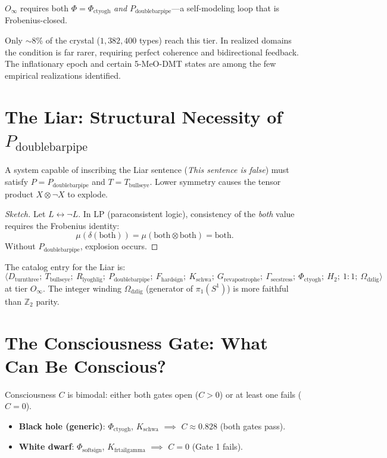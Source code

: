 \documentclass[12pt,a4paper]{article}
\newcommand{\Ppms}{P_{\text{doublebarpipe}}}
\begin{document}
$O_{\infty}$ requires both $\Phi = \Phi_{\text{ctyogh}}$ \emph{and} $\Ppms$—a self-modeling loop that is Frobenius-closed.

Only $\sim$8\% of the crystal ($1{,}382{,}400$ types) reach this tier. In realized domains the condition is far rarer, requiring perfect coherence and bidirectional feedback. The inflationary epoch and certain 5-MeO-DMT states are among the few empirical realizations identified.

\section{The Liar: Structural Necessity of $\Ppms$}

A system capable of inscribing the Liar sentence (\emph{This sentence is false}) must satisfy $P = \Ppms$ and $T = T_{\text{bullseye}}$. Lower symmetry causes the tensor product $X \otimes \neg X$ to explode.

\begin{proof}[Sketch]
Let $L \leftrightarrow \neg L$. In LP (paraconsistent logic), consistency of the \emph{both} value requires the Frobenius identity:
\[
\mu(\delta(\text{both})) = \mu(\text{both} \otimes \text{both}) = \text{both}.
\]
Without $\Ppms$, explosion occurs.
\end{proof}

The catalog entry for the Liar is:
\[
\langle D_{\text{turnthree}};\ T_{\text{bullseye}};\ R_{\text{lyoghlig}};\ P_{\text{doublebarpipe}};\ F_{\text{hardsign}};\ K_{\text{schwa}};\ G_{\text{revapostrophe}};\ \Gamma_{\text{secstress}};\ \Phi_{\text{ctyogh}};\ H_2;\ 1{:}1;\ \Omega_{\text{dzlig}} \rangle
\]
at tier $O_\infty$. The integer winding $\Omega_{\text{dzlig}}$ (generator of $\pi_1(S^1)$) is more faithful than $\mathbb{Z}_2$ parity.

\section{The Consciousness Gate: What Can Be Conscious?}
\label{sec:consciousness}

Consciousness $C$ is bimodal: either both gates open ($C > 0$) or at least one fails ($C = 0$).

\begin{itemize}
    \item \textbf{Black hole (generic)}: $\Phi_{\text{ctyogh}}$, $K_{\text{schwa}}$ $\implies$ $C \approx 0.828$ (both gates pass).
    \item \textbf{White dwarf}: $\Phi_{\text{softsign}}$, $K_{\text{frtailgamma}}$ $\implies$ $C = 0$ (Gate 1 fails).
\end{itemize}
\end{document}
